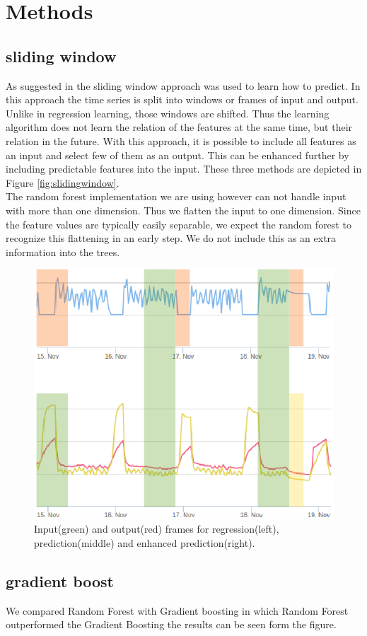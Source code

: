 \documentclass{scrartcl}
\begin{document}
\section{Methods}
\label{sec:methods}

\subsection{sliding window}

As suggested in \cite{vafaeipour2014application} the sliding window approach was used to learn how to predict. In this approach the time series is split into windows or frames of input and output. Unlike in regression learning, those windows are shifted. Thus the learning algorithm does not learn the relation of the features at the same time, but their relation in the future. With this approach, it is possible to include all features as an input and select few of them as an output. This can be enhanced further by including predictable features into the input. These three methods are depicted in Figure \ref{fig:slidingwindow}.\\
The random forest implementation we are using however can not handle input with more than one dimension. Thus we flatten the input to one dimension. Since the feature values are typically easily separable, we expect the random forest to recognize this flattening in an early step. We do not include this as an extra information into the trees.
\begin{figure}[H]
  \includegraphics[width=0.6\linewidth]{img/regpred.png}
  \caption{Input(green) and output(red) frames for regression(left), prediction(middle) and enhanced prediction(right).}
  \label{fig:correlation}
\end{figure}
\newpage
\subsection{gradient boost}
We compared Random Forest with Gradient boosting in which Random Forest outperformed the Gradient Boosting the results can be seen form the figure.
\end{document}
